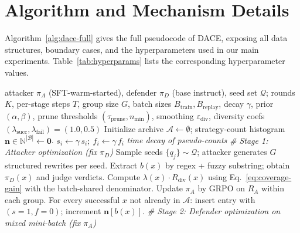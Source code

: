 \documentclass{article}
\newcommand{\method}{\textsc{DACE}\xspace}
\newcommand{\piA}{\pi_A}
\newcommand{\piD}{\pi_D}
\newcommand{\archive}{\mathcal{A}}
\newcommand{\strategyspace}{\mathcal{B}}
\begin{document}
\section{Algorithm and Mechanism Details}
\label{apdx:algorithm}

Algorithm~\ref{alg:dace-full} gives the full pseudocode of \method, exposing all data structures, boundary cases, and the hyperparameters used in our main experiments. Table~\ref{tab:hyperparams} lists the corresponding hyperparameter values.

\begin{algorithm}[h]
  \caption{\method training loop (full)}
  \label{alg:dace-full}
  \begin{algorithmic}[1]
    \REQUIRE attacker $\piA$ (SFT-warm-started), defender $\piD$ (base instruct), seed set $\mathcal{Q}$; rounds $K$, per-stage steps $T$, group size $G$, batch sizes $B_{\mathrm{train}},B_{\mathrm{replay}}$, decay $\gamma$, prior $(\alpha,\beta)$, prune thresholds $(\tau_{\mathrm{prune}}, n_{\min})$, smoothing $\varepsilon_{\mathrm{div}}$, diversity coefs $(\lambda_{\mathrm{succ}}, \lambda_{\mathrm{fail}})=(1.0, 0.5)$
    \STATE Initialize archive $\archive \leftarrow \emptyset$; strategy-count histogram $\mathbf{n}\in\mathbb{N}^{|\strategyspace|}\leftarrow\mathbf{0}$.
      \FOR{each $x_i \in \archive$}
        \STATE $s_i \leftarrow \gamma\,s_i;\ f_i \leftarrow \gamma\,f_i$ \hfill\textit{time decay of pseudo-counts}
      \ENDFOR
      \STATE \textit{\# Stage 1: Attacker optimization (fix $\piD$)}
        \STATE Sample seeds $\{q_j\}\sim\mathcal{Q}$; attacker generates $G$ structured rewrites per seed.
        \STATE Extract $b(x)$ by regex + fuzzy substring; obtain $\piD(x)$ and judge verdicts.
        \STATE Compute $\lambda(x)\cdot R_{\mathrm{div}}(x)$ using Eq.~\ref{eq:coverage-gain} with the batch-shared denominator.
        \STATE Update $\piA$ by GRPO on $R_A$ within each group.
        \STATE For every successful $x$ not already in $\archive$: insert entry with $(s{=}1, f{=}0)$; increment $\mathbf{n}[b(x)]$.
      \ENDFOR
      \STATE \textit{\# Stage 2: Defender optimization on mixed mini-batch (fix $\piA$)}

\end{algorithmic}
\end{algorithm}
\end{document}
